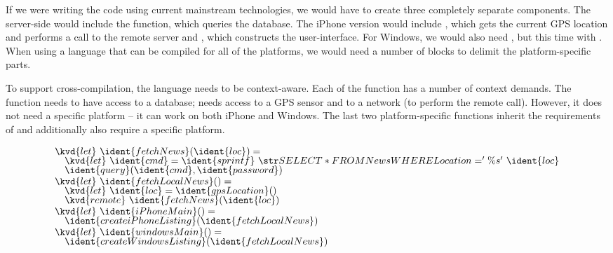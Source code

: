 If we were writing the code using current mainstream technologies, we would have to create three
completely separate components. The server-side would include the  function, which
queries the database. The iPhone version would include , which gets the current
GPS location and performs a call to the remote server and , which constructs the
user-interface. For Windows, we would also need , but this time with
. When using a language that can be compiled for all of the platforms, we would need
a number of  blocks to delimit the platform-specific parts.

To support cross-compilation, the language needs to be context-aware. Each of the function has a
number of context demands. The  function needs to have access to a database;
 needs access to a GPS sensor and to a network (to perform the remote call).
However, it does not need a specific platform -- it can work on both iPhone and Windows. The last
two platform-specific functions inherit the requirements of  and additionally
also require a specific platform.



\begin{figure}
\begin{equation*}
\begin{array}{l}
\kvd{let}~\ident{fetchNews}(\ident{loc}) =\\[-0.25em]
\hspace{1em} \kvd{let}~\ident{cmd} = \ident{sprintf}~\str{SELECT * FROM News WHERE Location='\%s'}~\ident{loc}\\[-0.25em]
\hspace{1em} \ident{query}(\ident{cmd}, \ident{password})\\[-0.25em]
\\[-1.0em]
\kvd{let}~\ident{fetchLocalNews}() =\\[-0.25em]
\hspace{1em} \kvd{let}~\ident{loc} = \ident{gpsLocation}()\\[-0.25em]
\hspace{1em} \kvd{remote}~\ident{fetchNews}(\ident{loc})\\[-0.25em]
\\[-1.0em]
\kvd{let}~\ident{iPhoneMain}() = \\[-0.25em]
\hspace{1em} \ident{createiPhoneListing}(\ident{fetchLocalNews})\\[-0.25em]
\\[-1.0em]
\kvd{let}~\ident{windowsMain}() = \\[-0.25em]
\hspace{1em} \ident{createWindowsListing}(\ident{fetchLocalNews})
\end{array}
\end{equation*}

\label{fig:introduction-sample}
\end{figure}

